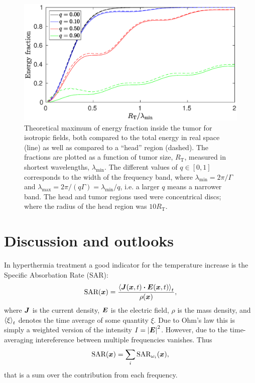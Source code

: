 \documentclass[11pt,a4paper, 
swedish,english %
]{article}
\newcommand{\RT}{\ensuremath{R_{\text{T}}}}
\begin{document}
\begin{figure}\centering
\centerline{ %
\includegraphics[width=18cm]{ring_both_L1000.eps}
}
\caption{Theoretical maximum of energy fraction inside the tumor for isotropic 
  fields, both compared to the total energy in real space (line) as well as
  compared to a ``head'' region (dashed). The fractions are plotted as
  a function of tumor size, $\RT$, measured in shortest wavelengths,
  $\lambda_{\min}$. The different values of $q\in[0, 1]$ corresponds to 
  the width of the frequency band, where $\lambda_{\min}=2\pi/\Gamma$ and
  $\lambda_{\max}=2\pi/(q\Gamma)=\lambda_{\min}/q$, i.e. a larger $q$
  means a narrower band. The head and tumor regions used were concentrical discs;
  where the radius of the head region was $10\RT$. }
\label{fig:both}
\end{figure}


\section{Discussion and outlooks}
In hyperthermia treatment a good indicator for the temperature
increase is the Specific Absorbation Rate (SAR): 
\begin{equation*}
\text{SAR}(\vb*x)=
\frac{\ev{\vb*J(\vb*x,t)\vdot \vb*E(\vb*x,t)}_t}{\rho(\vb*x)},
\end{equation*}
where $\vb*J$ is the current density, $\vb*E$ is the
electric field, $\rho$ is the mass density, and $\ev{\xi}_t$ denotes
the time average of some quantity $\xi$.
Due to Ohm's law this is simply a weighted version of the intensity
$I=\abs{\vb*E}^2$.
However, due to the time-averaging intereference between multiple
frequencies vanishes. Thus
\begin{equation}
\text{SAR}(\vb*x)=\sum_i\text{SAR}_{\omega_i}(\vb*x),
\end{equation}
that is a sum over the contribution from each frequency.
\end{document}
